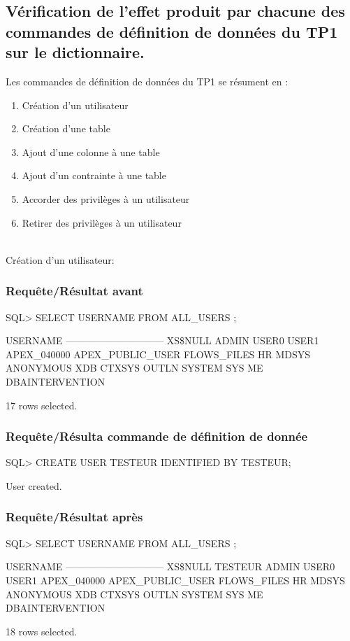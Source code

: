 \documentclass[•]{article}
\begin{document}
\subsection{Vérification de l'effet produit par chacune des commandes de définition de données du TP1 sur le dictionnaire.}
Les commandes de définition de données du TP1 se résument en : 
\begin{enumerate}
	\item Création d'un utilisateur
	\item Création d'une table
	\item Ajout d'une colonne à une table
	\item Ajout d'un contrainte à une table
	\item Accorder des privilèges à un utilisateur
	\item Retirer des privilèges à un utilisateur
	
\end{enumerate}
\textrm{  }
\\
\textrm{Création d'un utilisateur:}
\subsubsection{Requête/Résultat avant}
\begin{sql}
SQL> SELECT USERNAME FROM ALL_USERS ;

USERNAME
------------------------------
XS\$NULL
ADMIN
USER0
USER1
APEX_040000
APEX_PUBLIC_USER
FLOWS_FILES
HR
MDSYS
ANONYMOUS
XDB
CTXSYS
OUTLN
SYSTEM
SYS
ME
DBAINTERVENTION

17 rows selected.
\end{sql}
\subsubsection{Requête/Résulta commande de définition de donnée}
\begin{sql}
SQL> CREATE USER TESTEUR IDENTIFIED BY TESTEUR;

User created.
\end{sql}
\subsubsection{Requête/Résultat après}
\begin{sql}
SQL> SELECT USERNAME FROM ALL_USERS ;

USERNAME
------------------------------
XS\$NULL
TESTEUR
ADMIN
USER0
USER1
APEX_040000
APEX_PUBLIC_USER
FLOWS_FILES
HR
MDSYS
ANONYMOUS
XDB
CTXSYS
OUTLN
SYSTEM
SYS
ME
DBAINTERVENTION

18 rows selected.
\end{sql}
\end{document}
